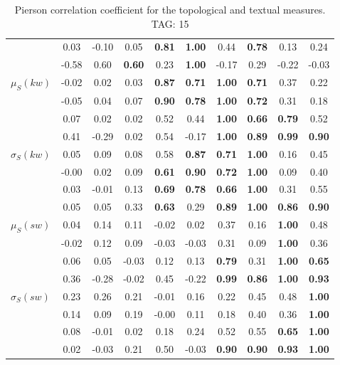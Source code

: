 \begin{table*}[h!]
\begin{center}
\begin{tabular}{| l || c | c | c | c | c | c | c | c | c |}
 & 0.03 & -0.10 & 0.05 & {\bf 0.81} & {\bf 1.00} & 0.44 & {\bf 0.78} & 0.13 & 0.24 \\
 & -0.58 & 0.60 & {\bf 0.60} & 0.23 & {\bf 1.00} & -0.17 & 0.29 & -0.22 & -0.03 \\\hline
$\mu_S(kw)$ & -0.02 & 0.02 & 0.03 & {\bf 0.87} & {\bf 0.71} & {\bf 1.00} & {\bf 0.71} & 0.37 & 0.22 \\
 & -0.05 & 0.04 & 0.07 & {\bf 0.90} & {\bf 0.78} & {\bf 1.00} & {\bf 0.72} & 0.31 & 0.18 \\
 & 0.07 & 0.02 & 0.02 & 0.52 & 0.44 & {\bf 1.00} & {\bf 0.66} & {\bf 0.79} & 0.52 \\
 & 0.41 & -0.29 & 0.02 & 0.54 & -0.17 & {\bf 1.00} & {\bf 0.89} & {\bf 0.99} & {\bf 0.90} \\\hline
$\sigma_S(kw)$ & 0.05 & 0.09 & 0.08 & 0.58 & {\bf 0.87} & {\bf 0.71} & {\bf 1.00} & 0.16 & 0.45 \\
 & -0.00 & 0.02 & 0.09 & {\bf 0.61} & {\bf 0.90} & {\bf 0.72} & {\bf 1.00} & 0.09 & 0.40 \\
 & 0.03 & -0.01 & 0.13 & {\bf 0.69} & {\bf 0.78} & {\bf 0.66} & {\bf 1.00} & 0.31 & 0.55 \\
 & 0.05 & 0.05 & 0.33 & {\bf 0.63} & 0.29 & {\bf 0.89} & {\bf 1.00} & {\bf 0.86} & {\bf 0.90} \\\hline
$\mu_S(sw)$ & 0.04 & 0.14 & 0.11 & -0.02 & 0.02 & 0.37 & 0.16 & {\bf 1.00} & 0.48 \\
 & -0.02 & 0.12 & 0.09 & -0.03 & -0.03 & 0.31 & 0.09 & {\bf 1.00} & 0.36 \\
 & 0.06 & 0.05 & -0.03 & 0.12 & 0.13 & {\bf 0.79} & 0.31 & {\bf 1.00} & {\bf 0.65} \\
 & 0.36 & -0.28 & -0.02 & 0.45 & -0.22 & {\bf 0.99} & {\bf 0.86} & {\bf 1.00} & {\bf 0.93} \\\hline
$\sigma_S(sw)$ & 0.23 & 0.26 & 0.21 & -0.01 & 0.16 & 0.22 & 0.45 & 0.48 & {\bf 1.00} \\
 & 0.14 & 0.09 & 0.19 & -0.00 & 0.11 & 0.18 & 0.40 & 0.36 & {\bf 1.00} \\
 & 0.08 & -0.01 & 0.02 & 0.18 & 0.24 & 0.52 & 0.55 & {\bf 0.65} & {\bf 1.00} \\
 & 0.02 & -0.03 & 0.21 & 0.50 & -0.03 & {\bf 0.90} & {\bf 0.90} & {\bf 0.93} & {\bf 1.00} \\\hline
\end{tabular}
\caption{Pierson correlation coefficient for the topological and textual measures. TAG: 15}
\end{center}
\end{table*}